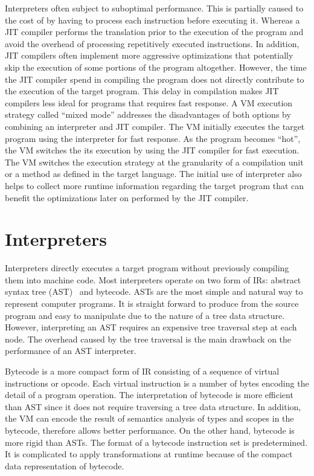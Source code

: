 Interpreters often subject to suboptimal performance.
This is partially caused to the cost of by having to process each instruction before executing it.
Whereas a JIT compiler performs the translation prior to the execution of the program and avoid the overhead of processing repetitively executed instructions.
In addition, JIT compilers often implement more aggressive optimizations that potentially skip the execution of some portions of the program altogether.
However, the time the JIT compiler spend in compiling the program does not directly contribute to the execution of the target program.
This delay in compilation makes JIT compilers less ideal for programs that requires fast response.
A VM execution strategy called ``mixed mode'' addresses the disadvantages of both options by combining an interpreter and JIT compiler.
The VM initially executes the target program using the interpreter for fast response.
As the program becomes ``hot'', the VM switches the its execution by using the JIT compiler for fast execution.
The VM switches the execution strategy at the granularity of a compilation unit or a method as defined in the target language.
The initial use of interpreter also helps to collect more runtime information regarding the target program that can benefit the optimizations later on performed by the JIT compiler.

\section{Interpreters}

Interpreters directly executes a target program without previously compiling them into machine code.
Most interpreters operate on two form of IRs: abstract syntax tree (AST)~\cite{jones2003abstract} and bytecode.
ASTs are the most simple and natural way to represent computer programs.
It is straight forward to produce from the source program and easy to manipulate due to the nature of a tree data structure.
However, interpreting an AST requires an expensive tree traversal step at each node.
The overhead caused by the tree traversal is the main drawback on the performance of an AST interpreter.

Bytecode is a more compact form of IR consisting of a sequence of virtual instructions or opcode.
Each virtual instruction is a number of bytes encoding the detail of a program operation.
The interpretation of bytecode is more efficient than AST since it does not require traversing a tree data structure.
In addition, the VM can encode the result of semantics analysis of types and scopes in the bytecode, therefore allows better performance.
On the other hand, bytecode is more rigid than ASTs.
The format of a bytecode instruction set is predetermined.
It is complicated to apply transformations at runtime because of the compact data representation of bytecode.

